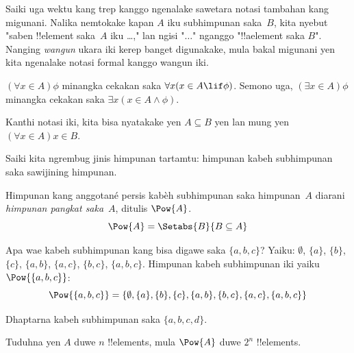 \documentclass[../../../include/open-logic-section]{subfiles}
\begin{document}
Saiki uga wektu kang trep kanggo ngenalake sawetara notasi
tambahan kang migunani. Nalika nemtokake kapan $A$ iku subhimpunan
saka~$B$, kita nyebut "saben !!{element} saka~$A$ iku \dots,"
lan ngisi "$\dots$" nganggo "!!a{element} saka $B$".
Nanging \emph{wangun} ukara iki kerep banget digunakake, mula
bakal migunani yen kita ngenalake notasi formal kanggo wangun iki.

\begin{defn}
$(\forall x \in A)\phi$ minangka cekakan saka $\forall x(x \in A \lif
\phi)$. Semono uga, $(\exists x \in A)\phi$ minangka cekakan saka
$\exists x(x\in A \land \phi)$.
\end{defn}

Kanthi notasi iki, kita bisa nyatakake yen $A \subseteq B$ yen lan
mung yen $(\forall x \in A)x \in B$.

Saiki kita ngrembug jinis himpunan tartamtu: himpunan kabeh
subhimpunan saka sawijining himpunan.

\begin{defn}
Himpunan kang anggotané persis kabèh subhimpunan saka himpunan~$A$ diarani
\emph{himpunan pangkat saka}~$A$, ditulis $\Pow{A}$.
  \[
    \Pow{A} = \Setabs{B}{B \subseteq A}
  \]
\end{defn}

\begin{ex}
Apa wae kabeh subhimpunan kang bisa digawe saka $\{ a, b, c \}$?
Yaiku: $\emptyset$, $\{a \}$, $\{b\}$, $\{c\}$, $\{a, b\}$,
$\{a, c\}$, $\{b,c\}$, $\{a, b, c\}$.
Himpunan kabeh subhimpunan iki yaiku $\Pow{\{a,b,c\}}$:
\[
\Pow{\{ a, b, c \}} = \{\emptyset, \{a \}, \{b\}, \{c\}, \{a, b\},
\{b, c\}, \{a, c\}, \{a, b, c\}\}
\]
\end{ex}

\begin{prob}
Dhaptarna kabeh subhimpunan saka $\{a, b, c, d\}$.
\end{prob}

\begin{prob}
Tuduhna yen $A$ duwe $n$ !!{element}s, mula $\Pow{A}$ duwe
$2^n$ !!{element}s.
\end{prob}
\end{document}

